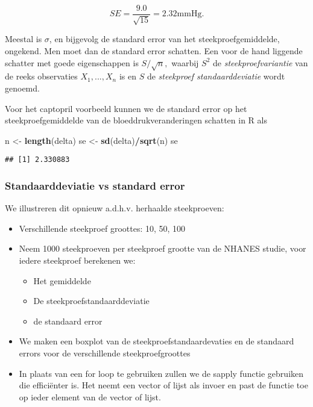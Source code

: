 \documentclass[
  12pt,dutch,coursenotes]{book}
\newenvironment{Shaded}{\begin{snugshade}}{\end{snugshade}}
\newcommand{\KeywordTok}[1]{\textcolor[rgb]{0.13,0.29,0.53}{\textbf{#1}}}
\newcommand{\NormalTok}[1]{#1}
\newcommand{\OperatorTok}[1]{\textcolor[rgb]{0.81,0.36,0.00}{\textbf{#1}}}
\newcommand{\StringTok}[1]{\textcolor[rgb]{0.31,0.60,0.02}{#1}}
\providecommand{\tightlist}{%
  \setlength{\itemsep}{0pt}\setlength{\parskip}{0pt}}
\theoremstyle{definition}
\theoremstyle{definition}
\theoremstyle{definition}
\theoremstyle{remark}
\begin{document}
\[
SE= \frac{9.0}{\sqrt{15}}=2.32\text{mmHg.}
\]

Meestal is \(\sigma\), en bijgevolg de standard error van het
steekproefgemiddelde, ongekend. Men moet dan de standard error schatten.
Een voor de hand liggende schatter met goede eigenschappen is \(S/\sqrt{n},\)
waarbij \(S^2\) de \emph{steekproefvariantie} van de reeks observaties \(X_1,...,X_n\) is en \(S\) de \emph{steekproef standaarddeviatie} wordt genoemd.

Voor het captopril voorbeeld kunnen we de standard error op het steekproefgemiddelde van de bloeddrukveranderingen schatten in R als

\begin{Shaded}
\begin{Highlighting}[]
\NormalTok{n \textless{}{-}}\StringTok{ }\KeywordTok{length}\NormalTok{(delta)}
\NormalTok{se \textless{}{-}}\StringTok{ }\KeywordTok{sd}\NormalTok{(delta)}\OperatorTok{/}\KeywordTok{sqrt}\NormalTok{(n)}
\NormalTok{se}
\end{Highlighting}
\end{Shaded}

\begin{verbatim}
## [1] 2.330883
\end{verbatim}

\hypertarget{standaarddeviatie-vs-standard-error}{%
\subsubsection{Standaarddeviatie vs standard error}\label{standaarddeviatie-vs-standard-error}}

We illustreren dit opnieuw a.d.h.v. herhaalde steekproeven:

\begin{itemize}
\item
  Verschillende steekproef groottes: 10, 50, 100
\item
  Neem 1000 steekproeven per steekproef grootte van de NHANES studie, voor iedere steekproef berekenen we:

  \begin{itemize}
  \tightlist
  \item
    Het gemiddelde
  \item
    De steekproefstandaarddeviatie
  \item
    de standaard error
  \end{itemize}
\item
  We maken een boxplot van de steekproefstandaardevaties en de standaard errors voor de verschillende steekproefgroottes
\item
  In plaats van een for loop te gebruiken zullen we de sapply functie gebruiken die efficiënter is. Het neemt een vector of lijst als invoer en past de functie toe op ieder element van de vector of lijst.
\end{itemize}
\end{document}
